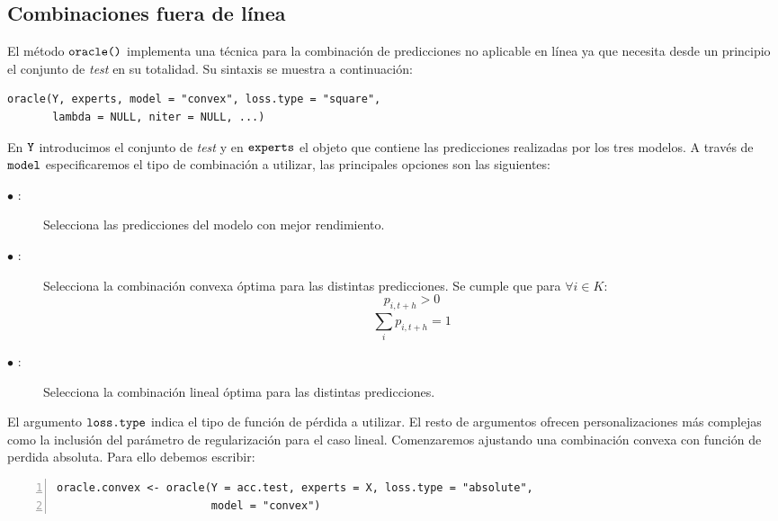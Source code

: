 \subsection{Combinaciones fuera de línea}
El método $\verb!oracle()!$ implementa una técnica para la combinación de predicciones no aplicable en línea ya que necesita desde un principio el conjunto de \textit{test} en su totalidad. Su sintaxis se muestra a continuación:
\begin{Verbatim}[fontsize=\footnotesize]
oracle(Y, experts, model = "convex", loss.type = "square",
       lambda = NULL, niter = NULL, ...)
\end{Verbatim}

En $\verb!Y!$ introducimos el conjunto de \textit{test} y en $\verb!experts!$ el objeto que contiene las predicciones realizadas por los tres modelos. A través de $\verb!model!$ especificaremos el tipo de combinación a utilizar, las principales opciones son las siguientes:
\begin{description}
  \item[$\bullet$ :]Selecciona las predicciones del modelo con mejor rendimiento.
  \item[$\bullet$ :]Selecciona la combinación convexa óptima para las distintas predicciones. Se cumple que para $\forall i \in K$:
  \begin{equation}
    p_{i,t+h} > 0
  \end{equation}
  \begin{equation}
    \sum_{i}^{} p_{i,t+h} = 1
  \end{equation}
  \item[$\bullet$ :]Selecciona la combinación lineal óptima para las distintas predicciones.
\end{description}

El argumento $\verb!loss.type!$ indica el tipo de función de pérdida a utilizar. El resto de argumentos ofrecen personalizaciones más complejas como la inclusión del parámetro de regularización para el caso lineal. Comenzaremos ajustando una combinación convexa con función de perdida absoluta. Para ello debemos escribir:
\begin{Verbatim}[fontsize=\footnotesize, numbers = left]
oracle.convex <- oracle(Y = acc.test, experts = X, loss.type = "absolute",
                        model = "convex")
\end{Verbatim}

